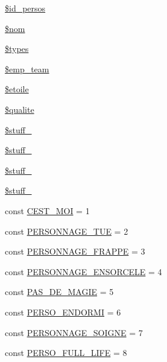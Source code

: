 \begin{DoxyCompactItemize}
\item 
\mbox{\hyperlink{class_personnage_a15e336d84fae2056f9d6e2b4eda94268}{\$id\+\_\+persos}}
\item 
\mbox{\hyperlink{class_personnage_a52bdc2f86e26ee040520cb2fce00c016}{\$nom}}
\item 
\mbox{\hyperlink{class_personnage_a359e3877a58637216b1922083c037726}{\$types}}
\item 
\mbox{\hyperlink{class_personnage_ac7f1848ab8c0148418dd22cb2fd2b2cc}{\$emp\+\_\+team}}
\item 
\mbox{\hyperlink{class_personnage_a44e2ea5698d1fd4d0f82cbbf65d26aa8}{\$etoile}}
\item 
\mbox{\hyperlink{class_personnage_a02762eb4d5e56672d1cba97679661b49}{\$qualite}}
\item 
\mbox{\hyperlink{class_personnage_a42e6869532c1ab4ef22b184a32e7731c}{\$stuff\+\_}}
\item 
\mbox{\hyperlink{class_personnage_a5d60aca8a94609c63fce087a54e1b514}{\$stuff\+\_}}
\item 
\mbox{\hyperlink{class_personnage_ad52a4939f1ca8f91609a49c593062010}{\$stuff\+\_}}
\item 
\mbox{\hyperlink{class_personnage_a322ac894cce887f9367f4a6db787c23c}{\$stuff\+\_}}
\item 
const \mbox{\hyperlink{class_personnage_ad046fb632492522d4ba4ec576886af4c}{C\+E\+S\+T\+\_\+\+M\+OI}} = 1
\item 
const \mbox{\hyperlink{class_personnage_ae654e11146b60710874ae7ddd8e0f9af}{P\+E\+R\+S\+O\+N\+N\+A\+G\+E\+\_\+\+T\+UE}} = 2
\item 
const \mbox{\hyperlink{class_personnage_a2e38e0c1c4678aa41c5c70415dc9f055}{P\+E\+R\+S\+O\+N\+N\+A\+G\+E\+\_\+\+F\+R\+A\+P\+PE}} = 3
\item 
const \mbox{\hyperlink{class_personnage_a3e00a0b7df1869a6a7bfe06aff0ca8ae}{P\+E\+R\+S\+O\+N\+N\+A\+G\+E\+\_\+\+E\+N\+S\+O\+R\+C\+E\+LE}} = 4
\item 
const \mbox{\hyperlink{class_personnage_af787cf8c787c7e07dda043c15f9bde35}{P\+A\+S\+\_\+\+D\+E\+\_\+\+M\+A\+G\+IE}} = 5
\item 
const \mbox{\hyperlink{class_personnage_af0cacca8d3367d4df844e24d456f6ab5}{P\+E\+R\+S\+O\+\_\+\+E\+N\+D\+O\+R\+MI}} = 6
\item 
const \mbox{\hyperlink{class_personnage_a8af7b48a38eda95264d46bd5b742a360}{P\+E\+R\+S\+O\+N\+N\+A\+G\+E\+\_\+\+S\+O\+I\+G\+NE}} = 7
\item 
const \mbox{\hyperlink{class_personnage_a47535a4f21f4edf5835d8fea36814f6a}{P\+E\+R\+S\+O\+\_\+\+F\+U\+L\+L\+\_\+\+L\+I\+FE}} = 8
\end{DoxyCompactItemize}
